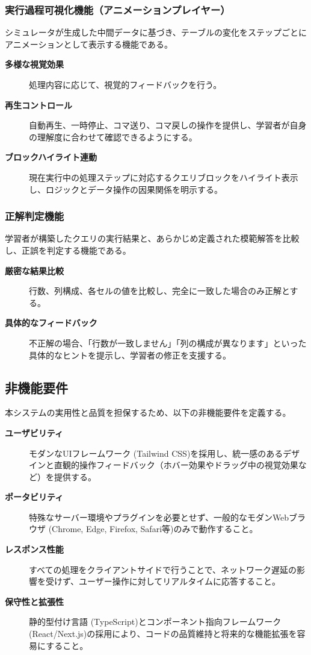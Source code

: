 \documentclass[uplatex,a4paper,12pt]{ujreport}
\begin{document}
\subsubsection*{実行過程可視化機能（アニメーションプレイヤー）}
シミュレータが生成した中間データに基づき、テーブルの変化をステップごとにアニメーションとして表示する機能である。
\begin{description}
  \item[\textbf{多様な視覚効果}] 処理内容に応じて、視覚的フィードバックを行う。%
  \item[\textbf{再生コントロール}] 自動再生、一時停止、コマ送り、コマ戻しの操作を提供し、学習者が自身の理解度に合わせて確認できるようにする。
  \item[\textbf{ブロックハイライト連動}] 現在実行中の処理ステップに対応するクエリブロックをハイライト表示し、ロジックとデータ操作の因果関係を明示する。
\end{description}

\subsubsection*{正解判定機能}
学習者が構築したクエリの実行結果と、あらかじめ定義された模範解答を比較し、正誤を判定する機能である。
\begin{description}
  \item[\textbf{厳密な結果比較}] 行数、列構成、各セルの値を比較し、完全に一致した場合のみ正解とする。
  \item[\textbf{具体的なフィードバック}] 不正解の場合、「行数が一致しません」「列の構成が異なります」といった具体的なヒントを提示し、学習者の修正を支援する。
\end{description}
\subsection{非機能要件}
本システムの実用性と品質を担保するため、以下の非機能要件を定義する。
\begin{description}
  \item[\textbf{ユーザビリティ}] モダンなUIフレームワーク (Tailwind CSS)を採用し、統一感のあるデザインと直観的操作フィードバック（ホバー効果やドラッグ中の視覚効果など）を提供する。
  \item[\textbf{ポータビリティ}] 特殊なサーバー環境やプラグインを必要とせず、一般的なモダンWebブラウザ (Chrome, Edge, Firefox, Safari等)のみで動作すること。
  \item[\textbf{レスポンス性能}] すべての処理をクライアントサイドで行うことで、ネットワーク遅延の影響を受けず、ユーザー操作に対してリアルタイムに応答すること。
  \item[\textbf{保守性と拡張性}] 静的型付け言語 (TypeScript)とコンポーネント指向フレームワーク (React/Next.js)の採用により、コードの品質維持と将来的な機能拡張を容易にすること。
\end{description}
\end{document}
